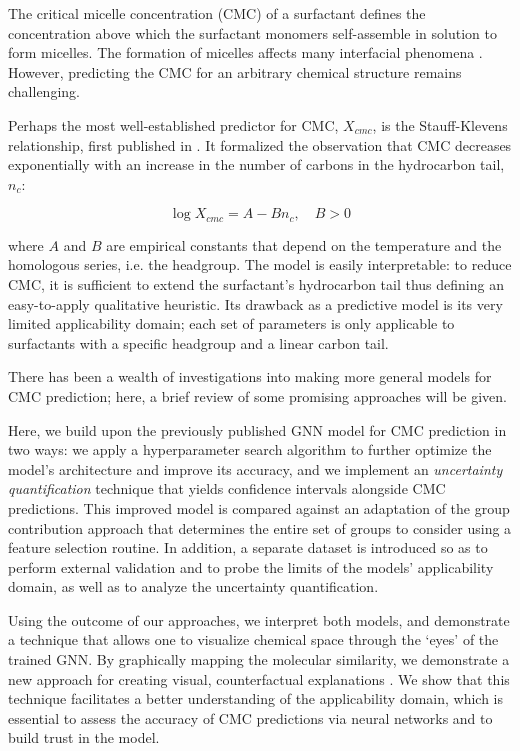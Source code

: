 The critical micelle concentration (CMC) of a surfactant defines the
concentration above which the surfactant monomers self-assemble in solution to
form micelles. The formation of micelles affects many interfacial phenomena
\cite{rosenSurfactantsInterfacialPhenomena2012}. However, predicting the CMC for
an arbitrary chemical structure remains challenging.

Perhaps the most well-established predictor for CMC, $X_{cmc}$, is the
Stauff-Klevens relationship, first published in
\citeyear{klevensStructureAggregationDilate1953}
\cite{klevensStructureAggregationDilate1953}. It formalized the observation that
CMC decreases exponentially with an increase in the number of carbons in the
hydrocarbon tail, $n_c$:

\begin{equation}
    \label{eq:klevens}
    \log X_{cmc} = A - Bn_c, \quad B > 0
\end{equation}

where $A$ and $B$ are empirical constants that depend on the temperature and the
homologous series, i.e. the headgroup. The model is easily interpretable: to
reduce CMC, it is sufficient to extend the surfactant's hydrocarbon tail thus
defining an easy-to-apply qualitative heuristic. Its drawback as a predictive
model is its very limited applicability domain; each set of parameters is only
applicable to surfactants with a specific headgroup and a linear carbon tail.

There has been a wealth of investigations into making more general models for
CMC prediction; here, a brief review of some promising approaches will be given.



Here, we build upon the previously published GNN model for CMC prediction
\cite{qinPredictingCriticalMicelle2021} in two ways: we apply a hyperparameter
search algorithm to further optimize the model's architecture and improve its
accuracy, and we implement an \emph{uncertainty quantification} technique that
yields confidence intervals alongside CMC predictions. This improved model is
compared against an adaptation of the group contribution approach that
determines the entire set of groups to consider using a feature selection
routine. In addition, a separate dataset is introduced so as to perform external
validation and to probe the limits of the models' applicability domain, as well
as to analyze the uncertainty quantification.

Using the outcome of our approaches, we interpret both models, and demonstrate a
technique that allows one to visualize chemical space through the `eyes' of the
trained GNN. By graphically mapping the molecular similarity, we demonstrate a
new approach for creating visual, counterfactual explanations
\cite{wellawattePerspectiveExplanationsMolecular2023}. We show that this
technique facilitates a better understanding of the applicability domain, which
is essential to assess the accuracy of CMC predictions via neural networks and
to build trust in the model.